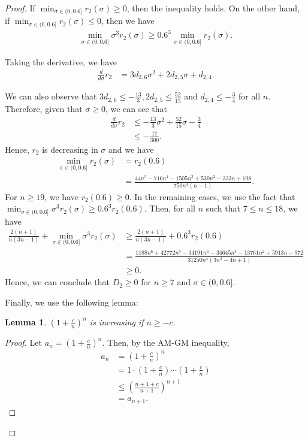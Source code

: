 \documentclass{article}
\theoremstyle{plain}
\newtheorem{lemma}[theorem]{Lemma}
\theoremstyle{definition}
\theoremstyle{remark}
\def\bigopen#1{\left(#1\right)}
\begin{document}
\begin{proof}
If $\min_{\sigma \in (0, 0.6]} r_2(\sigma) \ge 0$, then the inequality holds. On the other hand, if $\min_{\sigma \in (0, 0.6]} r_2(\sigma) \le 0$, then we have
\begin{align*}
     \min_{\sigma \in (0, 0.6]} \sigma^3 r_2(\sigma) \ge 0.6^3 \min_{\sigma \in (0, 0.6]} r_2(\sigma).
\end{align*}

Taking the derivative, we have 
\begin{align*}
    \frac{d}{d\sigma} r_2 &= 3d_{2,6}\sigma^2 + 2d_{2,5}\sigma + d_{2,4}.
\end{align*}

We can also observe that $3d_{2,6} \le -\frac{13}{3}, 2d_{2,5} \le \frac{52}{15}$ and $d_{2,4} \le -\frac{3}{4}$ for all $n$. Therefore, given that $\sigma \ge 0$, we can see that 
\begin{align*}
    \frac{d}{d\sigma} r_2 &\le -\frac{13}{3}\sigma^2 + \frac{52}{15}\sigma -\frac{3}{4} \\
    &\le -\frac{17}{300}.
\end{align*}
Hence, $r_2$ is decreasing in $\sigma$ and we have 
\begin{align*}
    \min_{\sigma \in (0, 0.6]} r_2(\sigma) &= r_2(0.6) \\
    &= \frac{44 n^5 - 716 n^4 - 1505 n^3 + 530 n^2 - 333 n + 108}{750 n^4 \bigopen{n - 1}}.
\end{align*}
For $n\ge 19$, we have $r_2(0.6)\ge 0$. In the remaining cases, we use the fact that $\min_{\sigma \in (0, 0.6]} \sigma^3 r_2(\sigma) \ge 0.6^3 r_2(0.6)$. Then, for all $n$ such that $7\le n\le 18$, we have 
\begin{align*}
    \frac{2(n+1)}{n(3n-1)} + \min_{\sigma \in (0, 0.6]} \sigma^3 r_2(\sigma) &\ge \frac{2(n+1)}{n(3n-1)} + 0.6^3 r_2(0.6) \\
    &= \frac{1188 n^6 + 42772 n^5 - 34191 n^4 - 34645 n^3 - 13761 n^2 + 5913 n - 972}{31250 n^4 (3 n^2 - 4 n + 1)} \\
    &\ge 0.
\end{align*}
Hence, we can conclude that $D_2 \ge 0$ for $n\ge 7$ and $\sigma \in (0, 0.6]$.

Finally, we use the following lemma: 
\begin{lemma} \label{lem:increasing}
$\bigopen{1+\frac{c}{n}}^n$ is increasing if $n\ge -c$.
\end{lemma}
\begin{proof}
Let $a_n = \bigopen{1+\frac{c}{n}}^n$. Then, by the AM-GM inequality, \begin{align*}
    a_n &= \bigopen{1+\frac{c}{n}}^n\\
    &= 1\cdot \bigopen{1+\frac{c}{n}} \cdots \bigopen{1+\frac{c}{n}}\\
    &\le \bigopen{\frac{n+1+c}{n+1}}^{n+1}\\
    &= a_{n+1}.
\end{align*}
\end{proof}


\end{proof}
\end{document}
